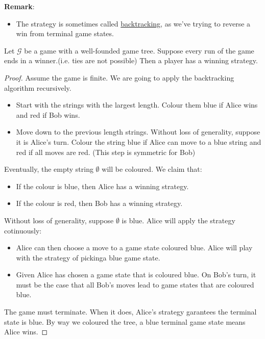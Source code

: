\textbf{Remark}:
\begin{itemize}
    \item The strategy is sometimes called \underline{backtracking}, as we've trying to reverse a win from terminal game states.
\end{itemize}

\begin{theorem}
    Let $\mathcal{G}$ be a game with a well-founded game tree. Suppose every run of the game ends in a winner.(i.e. ties are not possible) Then a player has a winning strategy.
\end{theorem}
\begin{proof}
    Assume the game is finite. 
    We are going to apply the backtracking algorithm recursively.
    \begin{itemize}
        \item Start with the strings with the largest length. Colour them blue if Alice wins and red if Bob wins.
        \item Move down to the previous length strings. Without loss of generality, suppose it is Alice's turn. Colour the string blue if Alice can move to a blue string and red if all moves are red. (This step is symmetric for Bob)
    \end{itemize}
    Eventually, the empty string $\emptyset$ will be coloured. We claim that:
    \begin{itemize}
        \item If the colour is blue, then Alice has a winning strategy.
        \item If the colour is red, then Bob has a winning strategy.
    \end{itemize}
    Without loss of generality, suppose $\emptyset$ is blue. Alice will apply the strategy cotinuously:
    \begin{itemize}
        \item Alice can then choose a move to a game state coloured blue. Alice will play with the strategy of pickinga blue game state.
        \item Given Alice has chosen a game state that is coloured blue. On Bob's turn, it must be the case that all Bob's moves lead to game states that are coloured blue.
    \end{itemize}
    The game must terminate. When it does, Alice's strategy garantees the terminal state is blue. 
    By way we coloured the tree, a blue terminal game state means Alice wins.
\end{proof}

